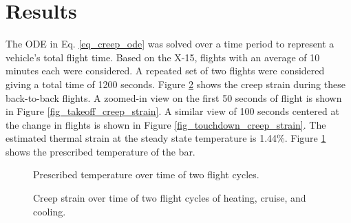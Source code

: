 \documentclass[conf]{new-aiaa}
\begin{document}
\section{Results}  %

The ODE in Eq. \ref{eq_creep_ode} was solved over a time period to represent a
vehicle's total flight time.
Based on the X-15, flights with an average of 10 minutes each 
\cite{ kordes_structureal_heating_experiencs_on_the_x15_airplane}
were considered.
A repeated set of two flights were considered giving a total time of 1200 seconds.
Figure \ref{fig_creep_strain} shows
the creep strain during these back-to-back flights.
A zoomed-in view on the first 50 seconds of flight is shown 
in Figure \ref{fig_takeoff_creep_strain}.
A similar view of 100 seconds centered at the change in flights is 
shown in Figure \ref{fig_touchdown_creep_strain}.
The estimated thermal strain at the steady state temperature is 1.44\%.
Figure \ref{fig_full_temperature} shows the prescribed temperature of the bar.

\begin{figure}[H]
  \centering
  \caption{ Prescribed temperature over time of two flight cycles.}
  \label{fig_full_temperature}
\end{figure}

\begin{figure}[H]
  \centering
  \caption{ Creep strain over time of two flight cycles of heating, cruise, and cooling.}
  \label{fig_creep_strain}
\end{figure}
\end{document}
